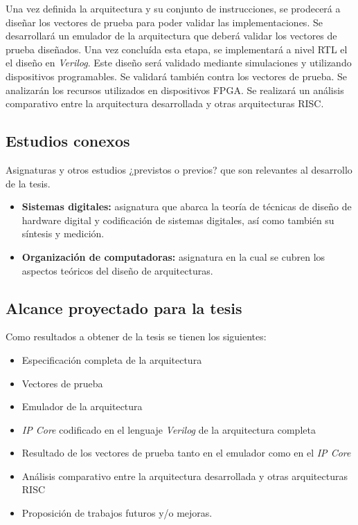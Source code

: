 \documentclass[a4paper]{article}
\begin{document}
Una vez definida la arquitectura y su conjunto de instrucciones, se prodecerá a diseñar los vectores de prueba para poder validar las implementaciones. Se desarrollará un emulador de la arquitectura que deberá validar los vectores de prueba diseñados. Una vez concluída esta etapa, se implementará a nivel RTL el el diseño en \emph{Verilog}. Este diseño será validado mediante simulaciones y utilizando dispositivos programables. Se validará también contra los vectores de prueba. Se analizarán los recursos utilizados en dispositivos FPGA. Se realizará un análisis comparativo entre la arquitectura desarrollada y otras arquitecturas RISC.

\subsection{Estudios conexos}

Asignaturas y otros estudios ¿previstos o previos? que son relevantes al desarrollo de la tesis.

\begin{itemize}
	\item \textbf{Sistemas digitales:} asignatura que abarca la teoría de técnicas de diseño de hardware digital y codificación de sistemas digitales, así como también su síntesis y medición.
	\item \textbf{Organización de computadoras:} asignatura en la cual se cubren los aspectos teóricos del diseño de arquitecturas.
\end{itemize}

\subsection{Alcance proyectado para la tesis}

Como resultados a obtener de la tesis se tienen los siguientes:

\begin{itemize}
    \item Especificación completa de la arquitectura
    \item Vectores de prueba
    \item Emulador de la arquitectura
    \item \emph{IP Core} codificado en el lenguaje \emph{Verilog} de la arquitectura completa
    \item Resultado de los vectores de prueba tanto en el emulador como en el \emph{IP Core}
    \item Análisis comparativo entre la arquitectura desarrollada y otras arquitecturas RISC
    \item Proposición de trabajos futuros y/o mejoras.
\end{itemize}
\end{document}
